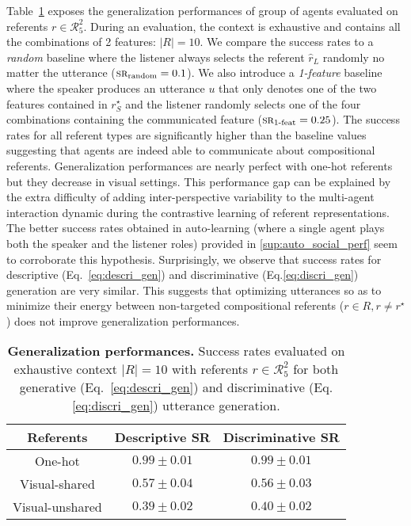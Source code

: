 Table~\ref{tab:generalization_perf} exposes the generalization performances of group of agents evaluated on referents $r \in \mathcal{R}_5^2$. During an evaluation, the context is exhaustive and contains all the combinations of 2 features: $|R|=10$. We compare the success rates to a \textit{random} baseline where the listener always selects the referent $\hat{r}_L$ randomly no matter the utterance ($\textsc{sr}_{\text{random}}=0.1$). We also introduce a \textit{1-feature} baseline where the speaker produces an utterance $u$ that only denotes one of the two features contained in $r_S^\star$ and the listener randomly selects one of the four combinations containing the communicated feature ($\textsc{sr}_{\text{1-feat}}=0.25$). The success rates for all referent types are significantly higher than the baseline values suggesting that agents are indeed able to communicate about compositional referents. Generalization performances are nearly perfect with one-hot referents but they decrease in visual settings. This performance gap can be explained by the extra difficulty of adding inter-perspective variability to the multi-agent interaction dynamic during the contrastive learning of referent representations. The better success rates obtained in auto-learning (where a single agent plays both the speaker and the listener roles) provided in \ap\ref{sup:auto_social_perf} seem to corroborate this hypothesis. Surprisingly, we observe that success rates for descriptive (Eq.~\ref{eq:descri_gen}) and discriminative (Eq.\ref{eq:discri_gen}) generation are very similar. This suggests that optimizing utterances so as to minimize their energy between non-targeted compositional referents ($r \in R, r \neq r^\star$) does not improve generalization performances.

\begin{table}[!h]
    \centering
    \begin{tabular}{|c|c|c|}
        \hline
        \textbf{Referents} & \textbf{Descriptive} \textsc{SR} & \textbf{Discriminative} \textsc{SR}  \\
        \hline
         One-hot & $0.99\pm0.01$ & $0.99\pm0.01$ \\
         Visual-shared & $0.57\pm0.04$ & $0.56\pm0.03$ \\
         Visual-unshared & $0.39\pm0.02$ & $0.40\pm0.02$ \\
         \hline
    \end{tabular}
    \caption{\textbf{Generalization performances. } Success rates evaluated on exhaustive context $|R|=10$ with referents $r \in \mathcal{R}_5^2$ for both generative (Eq.~\ref{eq:descri_gen}) and discriminative (Eq.\ref{eq:discri_gen}) utterance generation.}
    \label{tab:generalization_perf}
\end{table}

